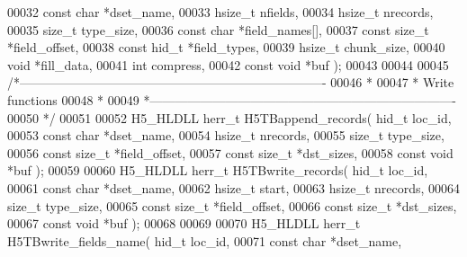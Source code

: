 \begin{DoxyCode}
00032                        \textcolor{keyword}{const} \textcolor{keywordtype}{char} *dset\_name,
00033                        hsize\_t nfields,
00034                        hsize\_t nrecords,
00035                        \textcolor{keywordtype}{size\_t} type\_size,
00036                        \textcolor{keyword}{const} \textcolor{keywordtype}{char} *field\_names[],
00037                        \textcolor{keyword}{const} \textcolor{keywordtype}{size\_t} *field\_offset,
00038                        \textcolor{keyword}{const} hid\_t *field\_types,
00039                        hsize\_t chunk\_size,
00040                        \textcolor{keywordtype}{void} *fill\_data,
00041                        \textcolor{keywordtype}{int} compress,
00042                        \textcolor{keyword}{const} \textcolor{keywordtype}{void} *buf );
00043 
00044 
00045 \textcolor{comment}{/*-------------------------------------------------------------------------}
00046 \textcolor{comment}{ *}
00047 \textcolor{comment}{ * Write functions}
00048 \textcolor{comment}{ *}
00049 \textcolor{comment}{ *-------------------------------------------------------------------------}
00050 \textcolor{comment}{ */}
00051 
00052 H5\_HLDLL herr\_t  H5TBappend\_records( hid\_t loc\_id,
00053                            \textcolor{keyword}{const} \textcolor{keywordtype}{char} *dset\_name,
00054                            hsize\_t nrecords,
00055                            \textcolor{keywordtype}{size\_t} type\_size,
00056                            \textcolor{keyword}{const} \textcolor{keywordtype}{size\_t} *field\_offset,
00057                            \textcolor{keyword}{const} \textcolor{keywordtype}{size\_t} *dst\_sizes,
00058                            \textcolor{keyword}{const} \textcolor{keywordtype}{void} *buf );
00059 
00060 H5\_HLDLL herr\_t  H5TBwrite\_records( hid\_t loc\_id,
00061                           \textcolor{keyword}{const} \textcolor{keywordtype}{char} *dset\_name,
00062                           hsize\_t start,
00063                           hsize\_t nrecords,
00064                           \textcolor{keywordtype}{size\_t} type\_size,
00065                           \textcolor{keyword}{const} \textcolor{keywordtype}{size\_t} *field\_offset,
00066                           \textcolor{keyword}{const} \textcolor{keywordtype}{size\_t} *dst\_sizes,
00067                           \textcolor{keyword}{const} \textcolor{keywordtype}{void} *buf );
00068 
00069 
00070 H5\_HLDLL herr\_t  H5TBwrite\_fields\_name( hid\_t loc\_id,
00071                               \textcolor{keyword}{const} \textcolor{keywordtype}{char} *dset\_name,

\end{DoxyCode}
